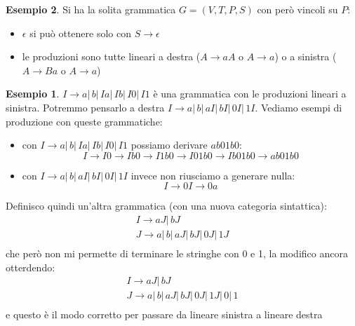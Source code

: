 \documentclass[a4paper]{book}
\theoremstyle{definition}%
\newtheorem*{esempio}{Esempio}
\begin{document}
\begin{esempio}
  Si ha la solita grammatica $G = (V, T, P, S)$ con però vincoli su $P$:
  \begin{itemize}
  \item $\epsilon$ si può ottenere solo con $S\to \epsilon$
  \item le produzioni sono tutte lineari a destra ($A\to aA$ o $A\to a$) o a sinistra ($A\to Ba$ o $A\to a$)
  \end{itemize}
\begin{esempio}
$I\to a|\,b|\,Ia|\,Ib|\,I0|\,I1$ è una grammatica con le produzioni lineari a sinistra.\newline
Potremmo pensarlo a destra $I\to a|\,b|\,aI|\,bI|\,0I|\,1I$.\newline
Vediamo esempi di produzione con queste grammatiche:
\begin{itemize}
\item con $I\to a|\,b|\,Ia|\,Ib|\,I0|\,I1$ possiamo derivare $ab01b0$:
\[ I\to I0\to Ib0\to I1b0\to I01b0\to Ib01b0\to ab01b0 \]
\item con $I\to a|\,b|\,aI|\,bI|\,0I|\,1I$ invece non riusciamo a generare nulla:
\[ I\to 0I\to 0a \]
\end{itemize}
Definisco quindi un'altra grammatica (con una nuova categoria sintattica):
\[ \begin{aligned}
  I\to aJ|\, bJ \\
  J\to a|\,b|\,aJ|\,bJ|\,0J|\,1J\\
  \end{aligned} \]
che però non mi permette di terminare le stringhe con 0 e 1, la modifico ancora otterdendo:
\[ \begin{aligned}
  I\to aJ|\, bJ\\
  J\to a|\,b|\,aJ|\,bJ|\,0J|\,1J|\,0|\,1\\
  \end{aligned} \]
e questo è il modo corretto per passare da lineare sinistra a lineare destra
\end{esempio}


\end{esempio}
\end{document}
